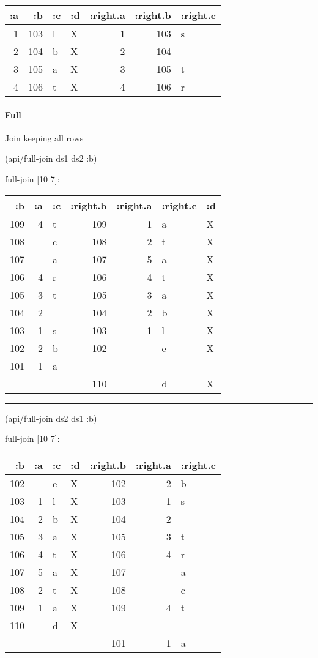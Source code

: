 \documentclass[]{article}
\newenvironment{Shaded}{\begin{snugshade}}{\end{snugshade}}
\newcommand{\AttributeTok}[1]{\textcolor[rgb]{0.77,0.63,0.00}{#1}}
\newcommand{\NormalTok}[1]{#1}
\let\oldparagraph\paragraph
\renewcommand{\paragraph}[1]{\oldparagraph{#1}\mbox{}}
\begin{document}
\begin{longtable}[]{@{}rrllrrl@{}}
\toprule
:a & :b & :c & :d & :right.a & :right.b & :right.c\tabularnewline
\midrule
\endhead
1 & 103 & l & X & 1 & 103 & s\tabularnewline
2 & 104 & b & X & 2 & 104 &\tabularnewline
3 & 105 & a & X & 3 & 105 & t\tabularnewline
4 & 106 & t & X & 4 & 106 & r\tabularnewline
\bottomrule
\end{longtable}

\paragraph{Full}\label{full}

Join keeping all rows

\begin{Shaded}
\begin{Highlighting}[]
\NormalTok{(api/full-join ds1 ds2 }\AttributeTok{:b}\NormalTok{)}
\end{Highlighting}
\end{Shaded}

full-join {[}10 7{]}:

\begin{longtable}[]{@{}rrlrrll@{}}
\toprule
:b & :a & :c & :right.b & :right.a & :right.c & :d\tabularnewline
\midrule
\endhead
109 & 4 & t & 109 & 1 & a & X\tabularnewline
108 & & c & 108 & 2 & t & X\tabularnewline
107 & & a & 107 & 5 & a & X\tabularnewline
106 & 4 & r & 106 & 4 & t & X\tabularnewline
105 & 3 & t & 105 & 3 & a & X\tabularnewline
104 & 2 & & 104 & 2 & b & X\tabularnewline
103 & 1 & s & 103 & 1 & l & X\tabularnewline
102 & 2 & b & 102 & & e & X\tabularnewline
101 & 1 & a & & & &\tabularnewline
& & & 110 & & d & X\tabularnewline
\bottomrule
\end{longtable}

\begin{center}\rule{0.5\linewidth}{0.5pt}\end{center}

\begin{Shaded}
\begin{Highlighting}[]
\NormalTok{(api/full-join ds2 ds1 }\AttributeTok{:b}\NormalTok{)}
\end{Highlighting}
\end{Shaded}

full-join {[}10 7{]}:

\begin{longtable}[]{@{}rrllrrl@{}}
\toprule
:b & :a & :c & :d & :right.b & :right.a & :right.c\tabularnewline
\midrule
\endhead
102 & & e & X & 102 & 2 & b\tabularnewline
103 & 1 & l & X & 103 & 1 & s\tabularnewline
104 & 2 & b & X & 104 & 2 &\tabularnewline
105 & 3 & a & X & 105 & 3 & t\tabularnewline
106 & 4 & t & X & 106 & 4 & r\tabularnewline
107 & 5 & a & X & 107 & & a\tabularnewline
108 & 2 & t & X & 108 & & c\tabularnewline
109 & 1 & a & X & 109 & 4 & t\tabularnewline
110 & & d & X & & &\tabularnewline
& & & & 101 & 1 & a\tabularnewline
\bottomrule
\end{longtable}
\end{document}
